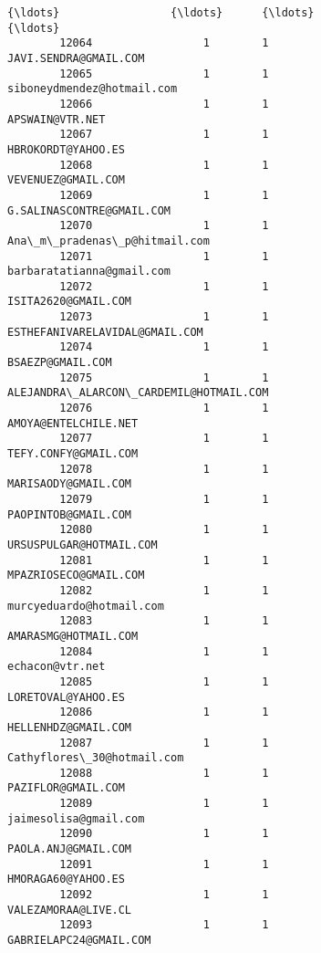 \documentclass[11pt]{article}
\begin{document}
\begin{Verbatim}[commandchars=\\\{\}]
        {\ldots}                 {\ldots}      {\ldots}                                     {\ldots}   
        12064                 1        1                   JAVI.SENDRA@GMAIL.COM   
        12065                 1        1              siboneydmendez@hotmail.com   
        12066                 1        1                         APSWAIN@VTR.NET   
        12067                 1        1                      HBROKORDT@YAHOO.ES   
        12068                 1        1                      VEVENUEZ@GMAIL.COM   
        12069                 1        1               G.SALINASCONTRE@GMAIL.COM   
        12070                 1        1            Ana\_m\_pradenas\_p@hitmail.com   
        12071                 1        1               barbaratatianna@gmail.com   
        12072                 1        1                     ISITA2620@GMAIL.COM   
        12073                 1        1          ESTHEFANIVARELAVIDAL@GMAIL.COM   
        12074                 1        1                        BSAEZP@GMAIL.COM   
        12075                 1        1  ALEJANDRA\_ALARCON\_CARDEMIL@HOTMAIL.COM   
        12076                 1        1                    AMOYA@ENTELCHILE.NET   
        12077                 1        1                    TEFY.CONFY@GMAIL.COM   
        12078                 1        1                     MARISAODY@GMAIL.COM   
        12079                 1        1                     PAOPINTOB@GMAIL.COM   
        12080                 1        1                 URSUSPULGAR@HOTMAIL.COM   
        12081                 1        1                   MPAZRIOSECO@GMAIL.COM   
        12082                 1        1                murcyeduardo@hotmail.com   
        12083                 1        1                    AMARASMG@HOTMAIL.COM   
        12084                 1        1                         echacon@vtr.net   
        12085                 1        1                      LORETOVAL@YAHOO.ES   
        12086                 1        1                     HELLENHDZ@GMAIL.COM   
        12087                 1        1              Cathyflores\_30@hotmail.com   
        12088                 1        1                      PAZIFLOR@GMAIL.COM   
        12089                 1        1                   jaimesolisa@gmail.com   
        12090                 1        1                     PAOLA.ANJ@GMAIL.COM   
        12091                 1        1                      HMORAGA60@YAHOO.ES   
        12092                 1        1                     VALEZAMORAA@LIVE.CL   
        12093                 1        1                  GABRIELAPC24@GMAIL.COM   
        

\end{Verbatim}
\end{document}

